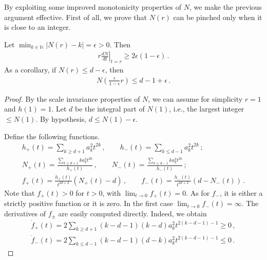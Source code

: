 \documentclass[11pt]{article}
\begin{document}
By exploiting some improved monotonicity properties of $N$, we make the previous argument effective. First of all, we prove that $N(r)$ can be pinched only when it is close to an integer. 
\begin{lemma}\label{lemma_Npinch}
 Let $\min_{k\in {\mathbb{N}}} {\left|{N(r)-k}\right|}=\epsilon>0$. Then 
 \begin{gather}
  r \left.\frac{d N}{dt} \right\vert_{t=r} \geq 2\epsilon(1-\epsilon)\, .
 \end{gather}
As a corollary, if $N(r)\leq d-\epsilon$, then
\begin{gather}
 N{\left({\frac{\epsilon}{1-\epsilon} r}\right)}\leq d-1+\epsilon\, .
\end{gather}
\end{lemma}
\begin{proof}
By the scale invariance properties of $N$, we can assume for simplicity $r=1$ and $h(1)=1$. Let $d$ be the integral part of $ N(1)$, i.e., the largest integer $\leq  N(1)$. By hypothesis, $d\leq N(1)-\epsilon$.

 Define the following functions.
 \begin{gather}\label{eq_hpm}
 h_+(t) = \sum_{k\geq d+1} a_k^2 t^{2k}\, , \quad \quad h_-(t) = \sum_{k\leq d-1} a_k^2 t^{2k}\, ;\\
 N_+ (t) = \frac{\sum_{k\geq d+1} k a_k ^2 t^{2k}}{h_+(t)}\, , \quad \quad N_- (t) = \frac{\sum_{k\leq d-1} k a_k ^2 t^{2k}}{h_-(t)}\, ;\label{eq_Npm}\\
 f_+(t) = \frac{h_+(t)}{t^{2d+2}}{\left({N_+(t)-d}\right)}\, , \quad \quad f_-(t) = \frac{h_-(t)}{t^{2d+2}}{\left({d-N_-(t)}\right)}\, .
 \end{gather}
Note that $f_+(t)>0$ for $t>0$, with $\lim_{t\to 0} f_+(t)=0$. As for $f_-$, it is either a strictly positive function or it is zero. In the first case $\lim_{t\to 0} f_-(t)=\infty$. The derivatives of $f_\pm$ are easily computed directly. Indeed, we obtain
\begin{gather}
 \dot f_+(t) = 2\sum_{k\geq d+1}  (k-d-1)(k-d) a_k^2 t^{2(k-d-1)-1}\geq 0 \, ,\\
  \dot f_-(t) = 2\sum_{k\leq d-1}  (k-d-1)(d-k) a_k^2 t^{2(k-d-1)-1}\leq 0 \, .
\end{gather}


\end{proof}
\end{document}
